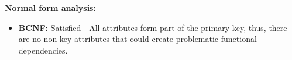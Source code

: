 \documentclass[a4paper, 12pt]{article}
\begin{document}
\textbf{Normal form analysis:}
\begin{itemize}
    \item \textbf{BCNF:} Satisfied -  All attributes form part of the primary key, thus, there are no non-key attributes that could create problematic functional dependencies.
\end{itemize}








\end{document}
